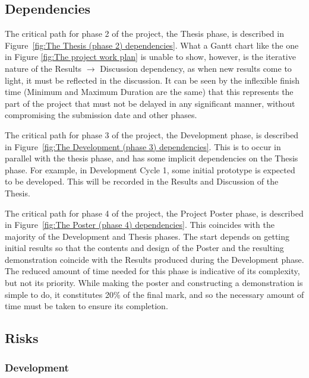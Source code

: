 \documentclass{article}
\begin{document}
\subsection{Dependencies}
\label{subsec:Dependencies}

The critical path for phase 2 of the project, the Thesis phase, is described in Figure~\ref{fig:The Thesis (phase 2) dependencies}.
What a Gantt chart like the one in Figure \ref{fig:The project work plan} is unable to show, however, is the iterative nature of the 
Results $\rightarrow$ Discussion dependency, as when new results come to light, it must be reflected in the discussion. It can be seen 
by the inflexible finish time (Minimum and Maximum Duration are the same) that this represents the part of the project 
that must not be delayed in any significant manner, without compromising the submission date and other phases.

The critical path for phase 3 of the project, the Development phase, is described in Figure~\ref{fig:The Development (phase 3) dependencies}.
This is to occur in parallel with the thesis phase, and has some implicit dependencies on the Thesis phase. For example, in Development Cycle 
1, some initial prototype is expected to be developed. This will be recorded in the Results and Discussion of the Thesis. 

The critical path for phase 4 of the project, the Project Poster phase, is described in Figure~\ref{fig:The Poster (phase 4) dependencies}.
This coincides with the majority of the Development and Thesis phases. The start depends on getting initial results so that the contents and
design of the Poster and the resulting demonstration coincide with the Results produced during the Development phase. The reduced amount of 
time needed for this phase is indicative of its complexity, but not its priority. While making the poster and constructing a demonstration 
is simple to do, it constitutes 20\% of the final mark, and so the necessary amount of time must be taken to ensure its completion.


\subsection{Risks}
\label{subsec:Risks}

\subsubsection{Development}
\label{subsubsec:Development}
\end{document}
